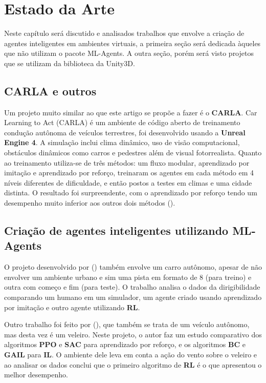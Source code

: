 \chapter{Estado da Arte}\label{cap:estArte}
Neste capítulo será discutido e analisados trabalhos que envolve a criação de agentes inteligentes em ambientes virtuais, a primeira seção será dedicada àqueles que não utilizam o pacote ML-Agents. A outra seção, porém será visto projetos que se utilizam da biblioteca da Unity3D.

\section*{CARLA e outros}
Um projeto muito similar ao que este artigo se propõe a fazer é o \textbf{CARLA}. Car Learning to Act (CARLA) é um ambiente de código aberto de treinamento condução autônoma de veículos terrestres, foi desenvolvido usando a \textbf{Unreal Engine 4}. A simulação inclui clima dinâmico, uso de visão computacional, obstáculos dinâmicos como carros e pedestres além de visual fotorrealista. Quanto ao treinamento utiliza-se de três métodos: um fluxo modular, aprendizado por imitação e aprendizado por reforço, treinaram os agentes em cada método em 4 níveis diferentes de dificuldade, e então postos a testes em climas e uma cidade distinta. O resultado foi surpreendente, com o aprendizado por reforço tendo um desempenho muito inferior aos outros dois métodos ().


\section*{Criação de agentes inteligentes utilizando ML-Agents}\label{sec:primTrab}
O projeto desenvolvido por () também envolve um carro autônomo, apesar de não envolver um ambiente urbano e sim uma pista em formato de 8 (para treino) e outra com começo e fim (para teste). O trabalho analisa o dados da dirigibilidade comparando um humano em um simulador, um agente criado usando aprendizado por imitação e outro agente utilizando \textbf{RL}. 

Outro trabalho foi feito por (), que também se trata de um veículo autônomo, mas desta vez é um veleiro. Neste projeto, o autor faz um estudo comparativo dos algoritmos \textbf{PPO} e \textbf{SAC} para aprendizado por reforço, e os algoritmos \textbf{BC} e \textbf{GAIL} para \textbf{IL}. O ambiente dele leva em conta a ação do vento sobre o veleiro e ao analisar os dados conclui que o primeiro algoritmo de \textbf{RL} é o que apresentou o melhor desempenho.